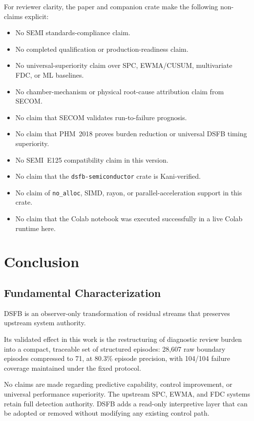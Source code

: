 \documentclass[11pt,letterpaper]{article}
\theoremstyle{scresult}
\begin{document}
For reviewer clarity, the paper and companion crate make the following
non-claims explicit:
\begin{itemize}
  \item No SEMI standards-compliance claim.
  \item No completed qualification or production-readiness claim.
  \item No universal-superiority claim over SPC, EWMA/CUSUM, multivariate
        FDC, or ML baselines.
  \item No chamber-mechanism or physical root-cause attribution claim from
        SECOM.
  \item No claim that SECOM validates run-to-failure prognosis.
  \item No claim that PHM~2018 proves burden reduction or universal DSFB
        timing superiority.
  \item No SEMI~E125 compatibility claim in this version.
  \item No claim that the \texttt{dsfb-semiconductor} crate is Kani-verified.
  \item No claim of \texttt{no\_alloc}, SIMD, rayon, or parallel-acceleration
        support in this crate.
  \item No claim that the Colab notebook was executed successfully in a live
        Colab runtime here.
\end{itemize}

\section{Conclusion}
\label{sec:conclusion}

\subsection{Fundamental Characterization}

DSFB is an observer-only transformation of residual streams that preserves
upstream system authority.

Its validated effect in this work is the restructuring of diagnostic review
burden into a compact, traceable set of structured episodes: 28{,}607 raw
boundary episodes compressed to 71, at 80.3\% episode precision, with 104/104
failure coverage maintained under the fixed protocol.

No claims are made regarding predictive capability, control improvement, or
universal performance superiority. The upstream SPC, EWMA, and FDC systems
retain full detection authority. DSFB adds a read-only interpretive layer that
can be adopted or removed without modifying any existing control path.
\end{document}
